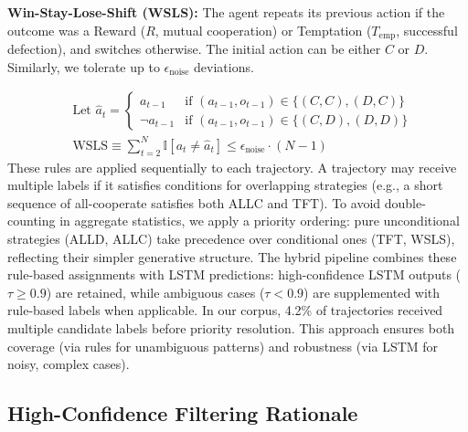 \documentclass{article}
\begin{document}
\textbf{Win-Stay-Lose-Shift (WSLS):} The agent repeats its previous action if the outcome was a Reward ($R$, mutual cooperation) or Temptation ($T_{\text{emp}}$, successful defection), and switches otherwise. The initial action can be either $C$ or $D$. Similarly, we tolerate up to $\epsilon_{\text{noise}}$ deviations.

\begin{equation*}
\begin{split}
& \text{Let } \hat{a}_t = 
    \begin{cases} 
        a_{t-1} & \text{if } (a_{t-1}, o_{t-1}) \in \{(C,C), (D,C)\} \\ 
        \neg a_{t-1} & \text{if } (a_{t-1}, o_{t-1}) \in \{(C,D), (D,D)\} 
    \end{cases} \\
& \text{WSLS} \equiv \sum_{t=2}^{N} \mathbb{I}\left[a_t \neq \hat{a}_t\right] \leq \epsilon_{\text{noise}} \cdot (N-1)
\end{split}
\end{equation*}
These rules are applied sequentially to each trajectory. A trajectory may receive multiple labels if it satisfies conditions for overlapping strategies (e.g., a short sequence of all-cooperate satisfies both ALLC and TFT). To avoid double-counting in aggregate statistics, we apply a priority ordering: pure unconditional strategies (ALLD, ALLC) take precedence over conditional ones (TFT, WSLS), reflecting their simpler generative structure. The hybrid pipeline combines these rule-based assignments with LSTM predictions: high-confidence LSTM outputs ($\tau \ge 0.9$) are retained, while ambiguous cases ($\tau < 0.9$) are supplemented with rule-based labels when applicable. In our corpus, 4.2\% of trajectories received multiple candidate labels before priority resolution. This approach ensures both coverage (via rules for unambiguous patterns) and robustness (via LSTM for noisy, complex cases).

\subsection{High-Confidence Filtering Rationale}
\label{appendix:filtering_rationale}
\end{document}

